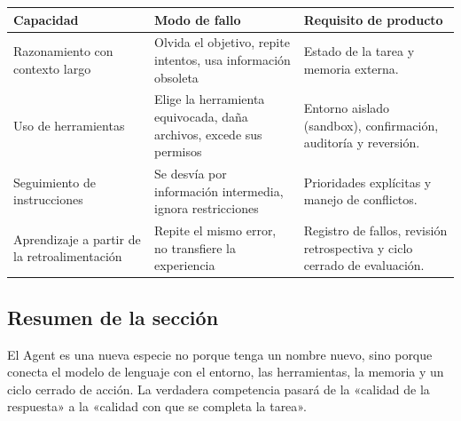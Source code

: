 \noindent\begin{tabularx}{\textwidth}{p{}p{}X}
\toprule
Capacidad & Modo de fallo & Requisito de producto \\
\midrule
Razonamiento con contexto largo & Olvida el objetivo, repite intentos, usa información obsoleta & Estado de la tarea y memoria externa. \\
Uso de herramientas & Elige la herramienta equivocada, daña archivos, excede sus permisos & Entorno aislado (sandbox), confirmación, auditoría y reversión. \\
Seguimiento de instrucciones & Se desvía por información intermedia, ignora restricciones & Prioridades explícitas y manejo de conflictos. \\
Aprendizaje a partir de la retroalimentación & Repite el mismo error, no transfiere la experiencia & Registro de fallos, revisión retrospectiva y ciclo cerrado de evaluación. \\
\bottomrule
\end{tabularx}

\subsection{Resumen de la sección}

El Agent es una nueva especie no porque tenga un nombre nuevo, sino porque conecta el modelo de lenguaje con el entorno, las herramientas, la memoria y un ciclo cerrado de acción. La verdadera competencia pasará de la «calidad de la respuesta» a la «calidad con que se completa la tarea».
